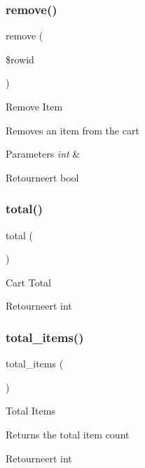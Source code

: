 \subsubsection{\texorpdfstring{remove()}{remove()}}
{\footnotesize\ttfamily remove (\begin{DoxyParamCaption}\item[{}]{\$rowid }\end{DoxyParamCaption})}

Remove Item

Removes an item from the cart


\begin{DoxyParams}{Parameters}
{\em int} & \\
\hline
\end{DoxyParams}
\begin{DoxyReturn}{Retourneert}
bool 
\end{DoxyReturn}
\mbox{\label{class_c_i___cart_a9efa17b570797933c7c5b0c68f743a55}} 
\subsubsection{\texorpdfstring{total()}{total()}}
{\footnotesize\ttfamily total (\begin{DoxyParamCaption}{ }\end{DoxyParamCaption})}

Cart Total

\begin{DoxyReturn}{Retourneert}
int 
\end{DoxyReturn}
\mbox{\label{class_c_i___cart_a785be13903ee65b8936d523b2728e53a}} 
\subsubsection{\texorpdfstring{total\_items()}{total\_items()}}
{\footnotesize\ttfamily total\+\_\+items (\begin{DoxyParamCaption}{ }\end{DoxyParamCaption})}

Total Items

Returns the total item count

\begin{DoxyReturn}{Retourneert}
int 
\end{DoxyReturn}
\mbox{\label{class_c_i___cart_adddf5d1a4f704b647f28b0322f8b64f2}} 
